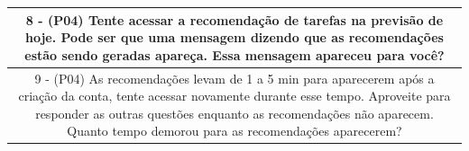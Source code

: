 \begin{table}[ht]
\begin{tabular}{c}
        \midrule
        \begin{minipage} [t] {1\textwidth} 8 - (P04) Tente acessar a recomendação de tarefas na previsão de hoje. Pode ser que uma mensagem dizendo que as recomendações estão sendo geradas apareça. Essa mensagem apareceu para você? \end{minipage}\\
        \midrule
        \begin{minipage} [t] {1\textwidth} 9 - (P04) As recomendações levam de 1 a 5 min para aparecerem após a criação da conta, tente acessar novamente durante esse tempo. Aproveite para responder as outras questões enquanto as recomendações não aparecem. Quanto tempo demorou para as recomendações aparecerem? \end{minipage}\\
        \bottomrule
    \end{tabular}
\end{table}




